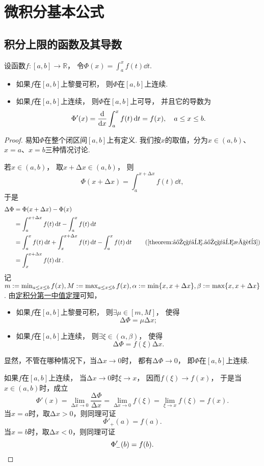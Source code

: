 \section{微积分基本公式}
\subsection{积分上限的函数及其导数}
\begin{theorem}\label{theorem:定积分.变限积分定理}
设函数\(f\colon[a,b]\to\mathbb{R}\)，
令\(\Phi(x)
= \int_a^x f(t) \dd{t}\).
\begin{itemize}
	\item 如果\(f\)在\([a,b]\)上黎曼可积，
	则\(\Phi\)在\([a,b]\)上连续.

	\item 如果\(f\)在\([a,b]\)上连续，
	则\(\Phi\)在\([a,b]\)上可导，
	并且它的导数为\[
		\Phi'(x)
		= \dv{x} \int_a^x f(t) \dd{t}
		= f(x),
		\quad a \leq x \leq b.
	\]
\end{itemize}
\begin{proof}
易知\(\Phi\)在整个闭区间\([a,b]\)上有定义.
我们按\(x\)的取值，分为\(x\in(a,b)\)、\(x=a\)、\(x=b\)三种情况讨论.

若\(x\in(a,b)\)，
取\(x + \increment x \in (a,b)\)，
则\[
	\Phi(x + \increment x) = \int_a^{x+\increment x} f(t) \dd{t},
\]
于是\begin{align*}
	\increment\Phi
	&= \Phi(x + \increment x) - \Phi(x) \\
	&= \int_a^{x+\increment x} f(t) \dd{t} - \int_a^x f(t) \dd{t} \\
	&= \int_a^x f(t) \dd{t} + \int_x^{x+\increment x} f(t) \dd{t} - \int_a^x f(t) \dd{t}
		\tag{\cref{theorem:定积分.定积分性质3}} \\
	&= \int_x^{x+\increment x} f(t) \dd{t}.
\end{align*}
记\(m := \min_{a \leq x \leq b} f(x),
M := \max_{a \leq x \leq b} f(x),
\alpha := \min\{x,x+\Delta x\},
\beta := \max\{x,x+\Delta x\}\).
由\hyperref[theorem:定积分.积分中值定理1]{定积分第一中值定理}可知，
\begin{itemize}
	\item 如果\(f\)在\([a,b]\)上黎曼可积，
	则\(\exists\mu\in[m,M]\)，
	使得\[
		\increment\Phi = \mu \increment x;
	\]

	\item 如果\(f\)在\([a,b]\)上连续，
	则\(\exists\xi\in(\alpha,\beta)\)，
	使得\[
		\increment\Phi = f(\xi) \increment x.
	\]
\end{itemize}
显然，不管在哪种情况下，当\(\increment x\to0\)时，
都有\(\increment\Phi\to0\)，
即\(\Phi\)在\([a,b]\)上连续.

如果\(f\)在\([a,b]\)上连续，
当\(\increment x\to0\)时\(\xi \to x\)，
因而\(f(\xi) \to f(x)\)，
于是当\(x\in(a,b)\)时，成立\[
	\Phi'(x)
	= \lim_{\increment x\to0} \frac{\increment\Phi}{\increment x}
	= \lim_{\increment x\to0} f(\xi)
	= \lim_{\xi \to x} f(\xi)
	= f(x).
\]
当\(x = a\)时，取\(\increment x > 0\)，则同理可证\[
	\Phi'_+(a) = f(a).
\]
当\(x = b\)时，取\(\increment x < 0\)，则同理可证\[
	\Phi'_-(b) = f(b).
	\qedhere
\]
\end{proof}
\end{theorem}
